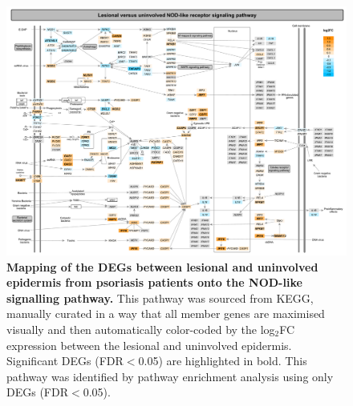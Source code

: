 \begin{landscape}
\begin{figure}[H]
\centering
\includegraphics[width=\textwidth]{./Results2/pdfs/PS_lesional_uninvolved_all_NOD_like_pathway}
\caption[Mapping of the DEGs between lesional and uninvolved epidermis from psoriasis patients onto the NOD-like signalling pathway.]{\textbf{Mapping of the DEGs between lesional and uninvolved epidermis from psoriasis patients onto the NOD-like signalling pathway.} This pathway was sourced from KEGG, manually curated in a way that all member genes are maximised visually and then automatically color-coded by the log$_2$FC expression between the lesional and uninvolved epidermis. Significant DEGs (FDR$<$0.05) are highlighted in bold. This pathway was identified by pathway enrichment analysis using only DEGs (FDR$<$0.05).}
\label{figure:PS_lesional_vs_uninvolved_HIF_pathway}
\end{figure}
\end{landscape}


